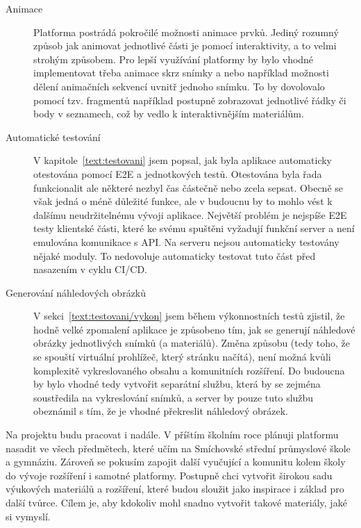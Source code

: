 \begin{description}
  \item[Animace] Platforma postrádá pokročilé možnosti animace prvků.
  Jediný rozumný způsob jak animovat jednotlivé části je pomocí interaktivity, a to velmi strohým způsobem.
  Pro lepší využívání platformy by bylo vhodné implementovat třeba animace skrz snímky a nebo například možnosti dělení animačních sekvencí uvnitř jednoho snímku.
  To by dovolovalo pomocí tzv. fragmentů například postupně zobrazovat jednotlivé řádky či body v seznamech, což by vedlo k interaktivnějším materiálům.

  \item[Automatické testování] V kapitole~\ref{text:testovani} jsem popsal, jak byla aplikace automaticky otestována pomocí E2E a jednotkových testů. 
  Otestována byla řada funkcionalit ale některé nezbyl čas částečně nebo zcela sepsat.
  Obecně se však jedná o méně důležité funkce, ale v budoucnu by to mohlo vést k dalšímu neudržitelnému vývoji aplikace.
  Největší problém je nejspíše E2E testy klientské části, které ke svému spuštěni vyžadují funkční server a není emulována komunikace s API.
  Na serveru nejsou automaticky testovány nějaké moduly.
  To nedovoluje automaticky testovat tuto část před nasazením v cyklu CI/CD.

  \item[Generování náhledových obrázků] V sekci~\ref{text:testovani/vykon} jsem během výkonnostních testů zjistil, že hodně velké zpomalení aplikace je způsobeno tím, jak se generují náhledové obrázky jednotlivých snímků (a materiálů).
  Změna způsobu (tedy toho, že se spouští virtuální prohlížeč, který stránku načítá), není možná kvůli komplexitě vykreslovaného obsahu a komunitních rozšíření.
  Do budoucna by bylo vhodné tedy vytvořit separátní službu, která by se zejména soustředila na vykreslování snímků, a server by pouze tuto službu obeznámil s tím, že je vhodné překreslit náhledový obrázek.
\end{description}

Na projektu budu pracovat i nadále. 
V příštím školním roce plánuji platformu nasadit ve všech předmětech, které učím na Smíchovské střední průmyslové škole a gymnáziu.
Zároveň se pokusím zapojit další vyučující a komunitu kolem školy do vývoje rozšíření i samotné platformy.
Postupně chci vytvořit širokou sadu výukových materiálů a rozšíření, které budou sloužit jako inspirace i základ pro další tvůrce. 
Cílem je, aby kdokoliv mohl snadno vytvořit takové materiály, jaké si vymyslí.
